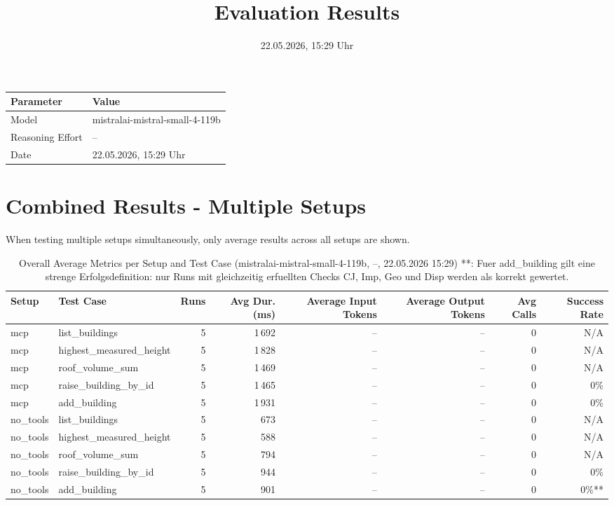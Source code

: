 \documentclass[a4paper,11pt]{article}
\title{Evaluation Results}
\date{22.05.2026, 15:29 Uhr}
\begin{document}
\maketitle

\begin{table}[H]
\centering
\begin{tabular}{l l}
\toprule
\textbf{Parameter} & \textbf{Value} \\
\midrule
Model & mistralai-mistral-small-4-119b \\
Reasoning Effort & -- \\
Date & 22.05.2026, 15:29 Uhr \\
\bottomrule
\end{tabular}
\end{table}

\tableofcontents
\clearpage

\section{Combined Results - Multiple Setups}

When testing multiple setups simultaneously, only average results across all setups are shown.

\begin{table}[H]
\centering
\scriptsize
\caption{Overall Average Metrics per Setup and Test Case (mistralai-mistral-small-4-119b, --, 22.05.2026 15:29) **: Fuer add\_building gilt eine strenge Erfolgsdefinition: nur Runs mit gleichzeitig erfuellten Checks CJ, Imp, Geo und Disp werden als korrekt gewertet.}
\begin{tabular}{l l r r r r r r}
\toprule
Setup & Test Case & Runs & Avg Dur. (ms) & Average Input Tokens & Average Output Tokens & Avg Calls & Success Rate \\
\midrule
mcp & list\_buildings & 5 & 1\,692 & -- & -- & 0 & N/A \\
mcp & highest\_measured\_height & 5 & 1\,828 & -- & -- & 0 & N/A \\
mcp & roof\_volume\_sum & 5 & 1\,469 & -- & -- & 0 & N/A \\
mcp & raise\_building\_by\_id & 5 & 1\,465 & -- & -- & 0 & 0\% \\
mcp & add\_building & 5 & 1\,931 & -- & -- & 0 & 0\% \\
\midrule
no\_tools & list\_buildings & 5 & 673 & -- & -- & 0 & N/A \\
no\_tools & highest\_measured\_height & 5 & 588 & -- & -- & 0 & N/A \\
no\_tools & roof\_volume\_sum & 5 & 794 & -- & -- & 0 & N/A \\
no\_tools & raise\_building\_by\_id & 5 & 944 & -- & -- & 0 & 0\% \\
no\_tools & add\_building & 5 & 901 & -- & -- & 0 & 0\%** \\
\bottomrule
\end{tabular}
\end{table}
\end{document}
